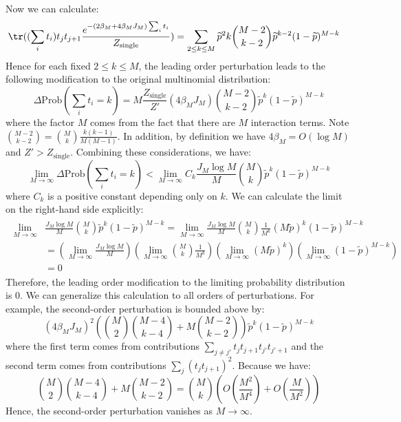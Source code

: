 \documentclass[a4paper,11pt]{article}
\theoremstyle{definition}
\numberwithin{equation}{section}
\begin{document}
Now we can calculate:
\begin{align}
    \begin{split}
        \tr((\sum_it_i)t_jt_{j + 1}\frac{e^{-(2\beta_M + 4\beta_M J_M)\sum_i t_i}}{Z_\text{single}}) &= \sum_{2\leq k\leq M}\widetilde{p}^2k\binom{M - 2}{k - 2}\widetilde{p}^{k - 2}(1 - \widetilde{p})^{M - k}
    \end{split}
\end{align}
Hence for each fixed $2\leq k\leq M$, the leading order perturbation leads to the following modification to the original multinomial distribution:
\begin{equation}
    \Delta\text{Prob}(\sum_i t_i = k) = M\frac{Z_\text{single}}{Z'}(4\beta_M J_M)\binom{M-2}{k-2}\widetilde{p}^k(1 - \widetilde{p})^{M - k}
\end{equation}
where the factor $M$ comes from the fact that there are $M$ interaction terms. Note $\binom{M - 2}{k-2} = \binom{M}{k}\frac{k(k -1)}{M(M - 1)}$. In addition, by definition we have $4\beta_M = O(\log M)$ and $Z' > Z_\text{single}$. Combining these considerations, we have:
\begin{equation}
    \lim_{M\rightarrow\infty}\Delta\text{Prob}(\sum_it_i = k) < \lim_{M\rightarrow\infty}C_k\frac{J_M\log M}{M}\binom{M}{k}\widetilde{p}^k(1-\widetilde{p})^{M-k}
\end{equation}
where $C_k$ is a positive constant depending only on $k$. We can calculate the limit on the right-hand side explicitly:
\begin{align}
    \begin{split}
        \lim_{M\rightarrow\infty}&\frac{J_M\log M}{M}\binom{M}{k}\widetilde{p}^k(1 - \widetilde{p})^{M - k} = \lim_{M\rightarrow\infty}\frac{J_M\log M}{M}\binom{M}{k}\frac{1}{M^k}(M\widetilde{p})^k(1-\widetilde{p})^{M - k}
        \\&=(\lim_{M\rightarrow\infty}\frac{J_M\log M}{M})(\lim_{M\rightarrow\infty}\binom{M}{k}\frac{1}{M^k})(\lim_{M\rightarrow\infty} (M\widetilde{p})^k)(\lim_{M\rightarrow\infty}(1 - \widetilde{p})^{M - k})
        \\&=0
    \end{split}
\end{align}
Therefore, the leading order modification to the limiting probability distribution is $0$. We can generalize this calculation to all orders of perturbations. For example, the second-order perturbation is bounded above by:
\begin{equation}
    (4\beta_M J_M)^2(\binom{M}{2}\binom{M-4}{k-4} + M\binom{M-2}{k-2})\widetilde{p}^k(1-\widetilde{p})^{M - k}
\end{equation}
where the first term comes from contributions $\sum_{j\neq j'}t_jt_{j +1}t_{j'}t_{j' + 1}$ and the second term comes from contributions $\sum_j(t_jt_{j+1})^2$. Because we have:
\begin{equation}
    \binom{M}{2}\binom{M-4}{k-4} + M\binom{M-2}{k-2} = \binom{M}{k}(O(\frac{M^2}{M^4}) + O(\frac{M}{M^2}))
\end{equation}
Hence, the second-order perturbation vanishes as $M\rightarrow\infty$.
\end{document}
